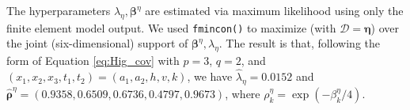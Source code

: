 \documentclass[12pt]{article}
\begin{document}
The hyperparameters $\lambda_\eta,\boldsymbol \beta^\eta$ are estimated %
%
via maximum likelihood using only the finite element model output.
%
%
We used \texttt{fmincon()} \citep{MATLAB2017} %
to maximize (with $\mathcal D=\boldsymbol\eta$) over the joint (six-dimensional) support of $\boldsymbol \beta^\eta,\lambda_\eta$.
%
The result is that, following the form of Equation \eqref{eq:Hig_cov} with $p=3$, $q=2$, and $(x_1,x_2,x_3,t_1,t_2)=(a_1,a_2,h,v,k)$, we have $\hat\lambda_\eta = 0.0152$ and $\boldsymbol {\hat\rho}^\eta = (0.9358, 0.6509, 0.6736, 0.4797, 0.9673)$,
where $\rho^\eta_k = \exp(-\beta_k^\eta/4)$.
%
\end{document}
